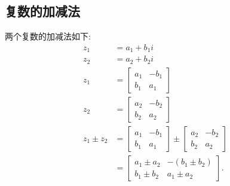 \subsection{复数的加减法}
两个复数的加减法如下:
$$
  \begin{aligned}
    z_{1}           & =a_{1}+b_{1} i                                                                      \\
    z_{2}           & =a_{2}+b_{2} i                                                                      \\
    z_{1}           & =\left[\begin{array}{cc}
        a_{1} & -b_{1} \\
        b_{1} & a_{1}
      \end{array}\right]                                            \\
    z_{2}           & =\left[\begin{array}{cc}
        a_{2} & -b_{2} \\
        b_{2} & a_{2}
      \end{array}\right]                                            \\
    z_{1} \pm z_{2} & =\left[\begin{array}{cc}
        a_{1} & -b_{1} \\
        b_{1} & a_{1}
      \end{array}\right] \pm\left[\begin{array}{cc}
        a_{2} & -b_{2} \\
        b_{2} & a_{2}
      \end{array}\right] \\
                    & =\left[\begin{array}{ll}
        a_{1} \pm a_{2} & -\left(b_{1} \pm b_{2}\right) \\
        b_{1} \pm b_{2} & a_{1} \pm a_{2}
      \end{array}\right] .
  \end{aligned}
$$

